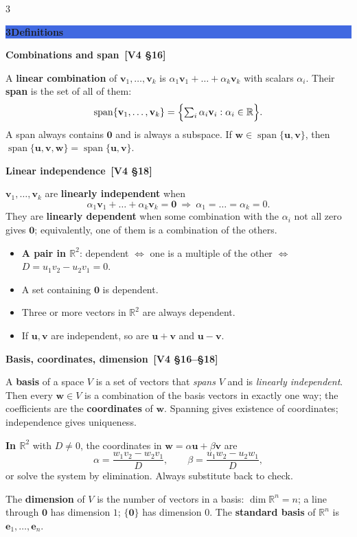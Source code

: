 \documentclass[8pt]{extarticle}
\newcommand{\sect}[2]{\par\vspace{4pt}\noindent
  \colorbox{RoyalBlue}{\parbox{\dimexpr\linewidth-2\fboxsep}{%
    \color{white}\bfseries\sffamily\normalsize #1\enspace #2}}\par\vspace{2pt}}
\newcommand{\sub}[1]{\par\vspace{3pt}\noindent
  {\color{RoyalBlue}\bfseries\sffamily #1}\par\vspace{0.5pt}}
\newcommand{\src}[1]{{\color{gray}\,[#1]}}
\newcommand{\R}{\mathbb{R}}
\newcommand{\vc}[1]{\mathbf{#1}}
\DeclareMathOperator{\spanop}{span}
\begin{document}
\begin{multicols*}{3}
\raggedcolumns
\sect{3}{Definitions}
\sub{Combinations and span \src{V4 \S16}}
A \textbf{linear combination} of $\vc{v}_1,\dots,\vc{v}_k$ is
$\alpha_1\vc{v}_1+\dots+\alpha_k\vc{v}_k$ with scalars $\alpha_i$. Their
\textbf{span} is the set of all of them:
\[
  \spanop\{\vc{v}_1,\dots,\vc{v}_k\}
  =\Bigl\{\textstyle\sum_{i}\alpha_i\vc{v}_i : \alpha_i\in\R\Bigr\}.
\]
A span always contains $\vc{0}$ and is always a subspace. If
$\vc{w}\in\spanop\{\vc{u},\vc{v}\}$, then
$\spanop\{\vc{u},\vc{v},\vc{w}\}=\spanop\{\vc{u},\vc{v}\}$.

\sub{Linear independence \src{V4 \S18}}
$\vc{v}_1,\dots,\vc{v}_k$ are \textbf{linearly independent} when
\[
  \alpha_1\vc{v}_1+\dots+\alpha_k\vc{v}_k=\vc{0}
  \ \Rightarrow\ \alpha_1=\dots=\alpha_k=0 .
\]
They are \textbf{linearly dependent} when some combination with the $\alpha_i$
not all zero gives $\vc{0}$; equivalently, one of them is a combination of the
others.
\begin{itemize}
  \item \textbf{A pair in $\R^{2}$}: dependent $\Leftrightarrow$ one is a
        multiple of the other $\Leftrightarrow$ $D=u_1v_2-u_2v_1=0$.
  \item A set containing $\vc{0}$ is dependent.
  \item Three or more vectors in $\R^{2}$ are always dependent.
  \item If $\vc{u},\vc{v}$ are independent, so are $\vc{u}+\vc{v}$ and
        $\vc{u}-\vc{v}$.
\end{itemize}

\sub{Basis, coordinates, dimension \src{V4 \S16--\S18}}
A \textbf{basis} of a space $V$ is a set of vectors that \emph{spans} $V$ and
is \emph{linearly independent}. Then every $\vc{w}\in V$ is a combination of
the basis vectors in exactly one way; the coefficients are the
\textbf{coordinates} of $\vc{w}$. Spanning gives existence of coordinates;
independence gives uniqueness.

\textbf{In $\R^{2}$} with $D\neq0$, the coordinates in
$\vc{w}=\alpha\vc{u}+\beta\vc{v}$ are
\[
  \alpha=\frac{w_1v_2-w_2v_1}{D},
  \qquad
  \beta=\frac{u_1w_2-u_2w_1}{D},
\]
or solve the system by elimination. Always substitute back to check.

The \textbf{dimension} of $V$ is the number of vectors in a basis:
$\dim\R^{n}=n$; a line through $\vc{0}$ has dimension $1$; $\{\vc{0}\}$ has
dimension $0$. The \textbf{standard basis} of $\R^{n}$ is
$\vc{e}_1,\dots,\vc{e}_n$.


\end{multicols*}
\end{document}
